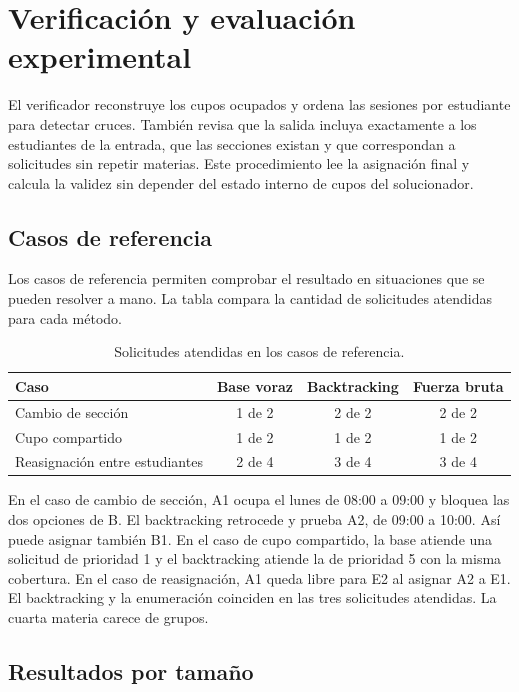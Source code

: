 \documentclass[11pt]{article}
\numberwithin{equation}{section}
\numberwithin{figure}{section}
\numberwithin{table}{section}
\theoremstyle{definition}
\begin{document}
\section{Verificación y evaluación experimental}

El verificador reconstruye los cupos ocupados y ordena las sesiones por
estudiante para detectar cruces. También revisa que la salida incluya
exactamente a los estudiantes de la entrada, que las secciones existan
y que correspondan a solicitudes sin repetir materias. Este procedimiento
lee la asignación final y calcula la validez sin depender del estado interno
de cupos del solucionador.

\subsection{Casos de referencia}

Los casos de referencia permiten comprobar el resultado en situaciones que
se pueden resolver a mano. La tabla compara la cantidad de solicitudes
atendidas para cada método.

\begin{table}[H]
\centering
\caption{Solicitudes atendidas en los casos de referencia.}
\begin{tabular}{lccc}
\toprule
Caso & Base voraz & Backtracking & Fuerza bruta \\
\midrule
Cambio de sección & 1 de 2 & 2 de 2 & 2 de 2 \\
Cupo compartido & 1 de 2 & 1 de 2 & 1 de 2 \\
Reasignación entre estudiantes & 2 de 4 & 3 de 4 & 3 de 4 \\
\bottomrule
\end{tabular}
\end{table}

En el caso de cambio de sección, A1 ocupa el lunes de 08:00 a 09:00 y
bloquea las dos opciones de B. El backtracking retrocede y prueba A2,
de 09:00 a 10:00. Así puede asignar también B1. En el caso de cupo
compartido, la base atiende una solicitud de prioridad 1 y el
backtracking atiende la de prioridad 5 con la misma cobertura. En el
caso de reasignación, A1 queda libre para E2 al asignar A2 a E1.
El backtracking y la enumeración coinciden en las tres solicitudes
atendidas. La cuarta materia carece de grupos.

\subsection{Resultados por tamaño}
\end{document}
